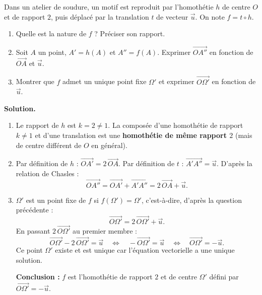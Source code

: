 \documentclass[11pt]{article}
\begin{document}
\begin{exoresolu}
Dans un atelier de soudure, un motif est reproduit par l'homothétie $h$ de centre $O$ et de rapport $2$, puis déplacé par la translation $t$ de vecteur $\vec{u}$. On note $f = t \circ h$.
\begin{enumerate}
\item Quelle est la nature de $f$ ? Préciser son rapport.
\item Soit $A$ un point, $A' = h(A)$ et $A'' = f(A)$. Exprimer $\overrightarrow{OA''}$ en fonction de $\overrightarrow{OA}$ et $\vec{u}$.
\item Montrer que $f$ admet un unique point fixe $\Omega'$ et exprimer $\overrightarrow{O\Omega'}$ en fonction de $\vec{u}$.
\end{enumerate}
\tcblower
\textbf{Solution.}
\begin{enumerate}
\item Le rapport de $h$ est $k = 2 \neq 1$. La composée d'une homothétie de rapport $k \neq 1$ et d'une translation est une \textbf{homothétie de même rapport $2$} (mais de centre différent de $O$ en général).

\item Par définition de $h$ : $\overrightarrow{OA'} = 2\,\overrightarrow{OA}$. Par définition de $t$ : $\overrightarrow{A'A''} = \vec{u}$. D'après la relation de Chasles :
\[ \overrightarrow{OA''} = \overrightarrow{OA'} + \overrightarrow{A'A''} = 2\,\overrightarrow{OA} + \vec{u}. \]

\item $\Omega'$ est un point fixe de $f$ si $f(\Omega') = \Omega'$, c'est-à-dire, d'après la question précédente :
\[ \overrightarrow{O\Omega'} = 2\,\overrightarrow{O\Omega'} + \vec{u}. \]
En passant $2\,\overrightarrow{O\Omega'}$ au premier membre :
\[ \overrightarrow{O\Omega'} - 2\,\overrightarrow{O\Omega'} = \vec{u} \quad\Longleftrightarrow\quad -\overrightarrow{O\Omega'} = \vec{u} \quad\Longleftrightarrow\quad \overrightarrow{O\Omega'} = -\vec{u}. \]
Ce point $\Omega'$ existe et est unique car l'équation vectorielle a une unique solution.

\textbf{Conclusion :} $f$ est l'homothétie de rapport $2$ et de centre $\Omega'$ défini par $\overrightarrow{O\Omega'} = -\vec{u}$.
\end{enumerate}
\end{exoresolu}
\end{document}

